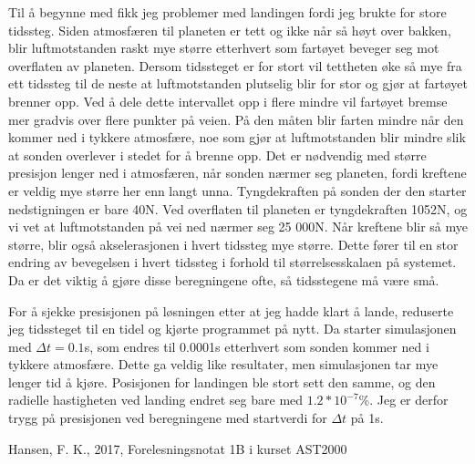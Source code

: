 \documentclass[reprint,english,notitlepage]{revtex4-1}  %
\begin{document}
Til å begynne med fikk jeg problemer med landingen fordi jeg brukte for store tidssteg. Siden atmosfæren til planeten er tett og ikke når så høyt over bakken, blir luftmotstanden raskt mye større etterhvert som fartøyet beveger seg mot overflaten av planeten. Dersom tidssteget er for stort vil tettheten øke så mye fra ett tidssteg til de neste at luftmotstanden plutselig blir for stor og gjør at fartøyet brenner opp. Ved å dele dette intervallet opp i flere mindre vil fartøyet bremse mer gradvis over flere punkter på veien. På den måten blir farten mindre når den kommer ned i tykkere atmosfære, noe som gjør at luftmotstanden blir mindre slik at sonden overlever i stedet for å brenne opp. Det er nødvendig med større presisjon lenger ned i atmosfæren, når sonden nærmer seg planeten, fordi kreftene er veldig mye større her enn langt unna. Tyngdekraften på sonden der den starter nedstigningen er bare 40N. Ved overflaten til planeten er tyngdekraften 1052N, og vi vet at luftmotstanden på vei ned nærmer seg 25 000N. Når kreftene blir så mye større, blir også akselerasjonen i hvert tidssteg mye større. Dette fører til en stor endring av bevegelsen i hvert tidssteg i forhold til størrelsesskalaen på systemet. Da er det viktig å gjøre disse beregningene ofte, så tidsstegene må være små.

For å sjekke presisjonen på løsningen etter at jeg hadde klart å lande, reduserte jeg tidssteget til en tidel og kjørte programmet på nytt. Da starter simulasjonen med $\Delta t = 0.1$s, som endres til 0.0001s etterhvert som sonden kommer ned i tykkere atmosfære. Dette ga veldig like resultater, men simulasjonen tar mye lenger tid å kjøre. Posisjonen for landingen ble stort sett den samme, og den radielle hastigheten ved landing endret seg bare med $1.2 * 10^{-7}$\%. Jeg er derfor trygg på presisjonen ved beregningene med startverdi for $\Delta t$ på 1s.



\begin{thebibliography}{}
 Hansen, F. K.,  2017, Forelesningsnotat 1B i kurset AST2000


\end{thebibliography}
\end{document}
